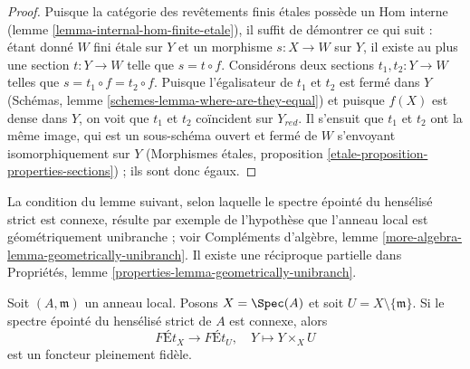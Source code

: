 \begin{proof}
Puisque la catégorie des revêtements finis étales possède un
Hom interne (lemme \ref{lemma-internal-hom-finite-etale}),
il suffit de démontrer ce qui suit : étant donné $W$ fini étale sur $Y$
et un morphisme $s : X \to W$ sur $Y$, il existe au plus une section
$t : Y \to W$ telle que $s = t \circ f$. Considérons deux sections
$t_1, t_2 : Y \to W$ telles que $s = t_1 \circ f = t_2 \circ f$.
Puisque l'égalisateur de $t_1$ et $t_2$ est fermé dans $Y$
(Schémas, lemme \ref{schemes-lemma-where-are-they-equal})
et puisque $f(X)$ est dense dans $Y$, on voit que $t_1$ et $t_2$
coïncident sur $Y_{red}$. Il s'ensuit que $t_1$ et $t_2$ ont
la même image, qui est un sous-schéma ouvert et fermé de $W$ s'envoyant
isomorphiquement sur $Y$
(Morphismes étales, proposition \ref{etale-proposition-properties-sections}) ;
ils sont donc égaux.
\end{proof}

\noindent
La condition du lemme suivant, selon laquelle le spectre épointé
du hensélisé strict est connexe, résulte par exemple de
l'hypothèse que l'anneau local est géométriquement unibranche ; voir
Compléments d'algèbre, lemme \ref{more-algebra-lemma-geometrically-unibranch}.
Il existe une réciproque partielle dans
Propriétés, lemme \ref{properties-lemma-geometrically-unibranch}.

\begin{lemma}
\label{lemma-same-etale-extensions}
Soit $(A, \mathfrak m)$ un anneau local. Posons $X = \Spec(A)$
et soit $U = X \setminus \{\mathfrak m\}$. Si le spectre épointé
du hensélisé strict de $A$ est connexe, alors
$$
\textit{F\'Et}_X \longrightarrow \textit{F\'Et}_U,\quad
Y \longmapsto Y \times_X U
$$
est un foncteur pleinement fidèle.
\end{lemma}

